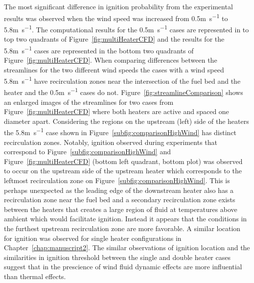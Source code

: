     The most significant difference in ignition probability from the experimental results was observed when the wind speed was increased from 0.5\si{\meter\per\second} to 5.8\si{\meter\per\second}. The computational results for the 0.5\si{\meter\per\second} cases are represented in to top two quadrants of Figure~\ref{fig:multiHeaterCFD} and the results for the 5.8\si{\meter\per\second} cases are represented in the bottom two quadrants of Figure~\ref{fig:multiHeaterCFD}. When comparing differences between the streamlines for the two different wind speeds the cases with a wind speed 5.8\si{\meter\per\second} have recirculation zones near the intersection of the fuel bed and the heater and the 0.5\si{\meter\per\second} cases do not. Figure~\ref{fig:streamlineComparison} shows an enlarged images of the streamlines for two cases from Figure~\ref{fig:multiHeaterCFD} where both heaters are active and spaced one diameter apart. Considering the regions on the upstream (left) side of the heaters the 5.8\si{\meter\per\second} case shown in Figure~\ref{subfig:comparisonHighWind} has distinct recirculation zones. Notably, ignition observed during experiments that correspond to Figure~\ref{subfig:comparisonHighWind} and Figure~\ref{fig:multiHeaterCFD} (bottom left quadrant, bottom plot) was observed to occur on the upstream side of the upstream heater which corresponds to the leftmost recirculation zone on Figure~\ref{subfig:comparisonHighWind}. This is perhaps unexpected as the leading edge of the downstream heater also has a recirculation zone near the fuel bed and a secondary recirculation zone exists between the heaters that creates a large region of fluid at temperatures above ambient which would facilitate ignition. Instead it appears that the conditions in the furthest upstream recirculation zone are more favorable. A similar location for ignition was observed for single heater configurations in Chapter~\ref{chap:manuscript2}. The similar observations of ignition location and the similarities in ignition threshold between the single and double heater cases suggest that in the prescience of wind fluid dynamic effects are more influential than thermal effects.
